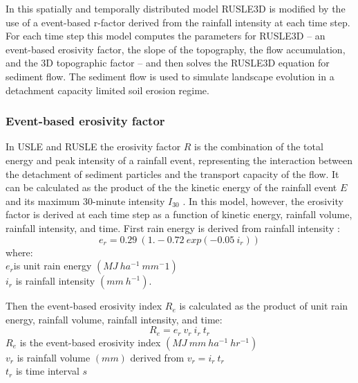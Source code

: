 \documentclass[esurf, manuscript]{copernicus}
\begin{document}
In this spatially and temporally distributed model 
RUSLE3D is modified by the use of a 
event-based r-factor derived from the rainfall intensity 
at each time step.
For each time step
this model computes the parameters for RUSLE3D -- 
an event-based erosivity factor,
the slope of the topography, the flow accumulation, and
the 3D topographic factor -- and then
solves the RUSLE3D equation for sediment flow. 
The sediment flow is used to simulate landscape evolution 
in a detachment capacity limited soil erosion regime.



\subsubsection{Event-based erosivity factor}

In USLE and RUSLE the erosivity factor $R$ 
is the combination of the total energy and peak intensity of a rainfall event,
representing the interaction between the detachment of sediment particles
and the transport capacity of the flow. 
It can be calculated as the product of the 
the kinetic energy of the rainfall event $E$
and its maximum 30-minute intensity $I_{30}$
\citep{Brown1987,Renard1997}.
In this model, however, the erosivity factor
is derived at each time step as a function of
kinetic energy, rainfall volume, rainfall intensity, and time.
First rain energy is derived from rainfall intensity \citep{Brown1987}:
%
\begin{equation}
\label{eq:rain_energy}
{e_r = 0.29 ~ (1.-0.72 ~ exp(-0.05 ~ i_r))}
\end{equation}
%
{\small
\noindent
where: \\
\noindent
\hspace*{0.5em} $e_r$is unit rain energy $(MJ ~ ha^{-1} ~ mm{^-1})$\\
\hspace*{0.5em} $i_r$ is rainfall intensity $(mm ~ h^{-1})$.\\
}

\noindent
Then the event-based erosivity index $R_e$ 
is calculated as the product of 
unit rain energy, rainfall volume, rainfall intensity, and time: 
\begin{equation}
\label{eq:erosivity_index}
{R_e = e_r ~ v_r ~ i_r ~ t_r}
\end{equation}
%
{\small
\noindent
\hspace*{0.5em} $R_e$ is the event-based erosivity index $(MJ ~ mm ~ ha^{-1} ~ hr^{-1})$\\
\hspace*{0.5em} $v_r$ is rainfall volume $(mm)$ derived from ${v_r = i_r ~ t_r}$\\
\hspace*{0.5em} $t_r$ is time interval $s$\\ 
}
\end{document}

